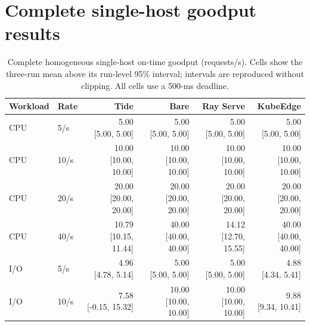 \section*{Complete single-host goodput results}
\begin{table}[htbp]\centering\footnotesize
\caption{Complete homogeneous single-host on-time goodput (requests/s). Cells show the three-run mean above its run-level 95\% interval; intervals are reproduced without clipping. All cells use a 500-ms deadline.}
\label{tab:full-single-host}
\begin{tabular}{llrrrr}\toprule
Workload & Rate & Tide & Bare & Ray Serve & KubeEdge\\\midrule
CPU & 5/s & \shortstack{5.00\\{[5.00, 5.00]}} & \shortstack{5.00\\{[5.00, 5.00]}} & \shortstack{5.00\\{[5.00, 5.00]}} & \shortstack{5.00\\{[5.00, 5.00]}}\\[3pt]
CPU & 10/s & \shortstack{10.00\\{[10.00, 10.00]}} & \shortstack{10.00\\{[10.00, 10.00]}} & \shortstack{10.00\\{[10.00, 10.00]}} & \shortstack{10.00\\{[10.00, 10.00]}}\\[3pt]
CPU & 20/s & \shortstack{20.00\\{[20.00, 20.00]}} & \shortstack{20.00\\{[20.00, 20.00]}} & \shortstack{20.00\\{[20.00, 20.00]}} & \shortstack{20.00\\{[20.00, 20.00]}}\\[3pt]
CPU & 40/s & \shortstack{10.79\\{[10.15, 11.44]}} & \shortstack{40.00\\{[40.00, 40.00]}} & \shortstack{14.12\\{[12.70, 15.55]}} & \shortstack{40.00\\{[40.00, 40.00]}}\\[3pt]
I/O & 5/s & \shortstack{4.96\\{[4.78, 5.14]}} & \shortstack{5.00\\{[5.00, 5.00]}} & \shortstack{5.00\\{[5.00, 5.00]}} & \shortstack{4.88\\{[4.34, 5.41]}}\\[3pt]
I/O & 10/s & \shortstack{7.58\\{[-0.15, 15.32]}} & \shortstack{10.00\\{[10.00, 10.00]}} & \shortstack{10.00\\{[10.00, 10.00]}} & \shortstack{9.88\\{[9.34, 10.41]}}\\[3pt]

\end{tabular}
\end{table}
